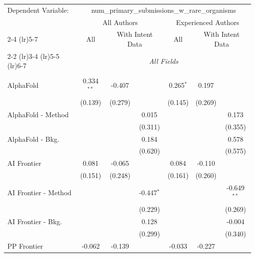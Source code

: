 \begingroup
\centering
\begin{tabular}{lcccccc}
   \tabularnewline \midrule \midrule
   Dependent Variable: & \multicolumn{6}{c}{num\_primary\_submissions\_w\_rare\_organisms}\\
 & \multicolumn{3}{c}{All Authors} & \multicolumn{3}{c}{Experienced Authors} \\
\cmidrule(lr){2-4} \cmidrule(lr){5-7}
 & \multicolumn{1}{c}{All} & \multicolumn{2}{c}{With Intent Data} & \multicolumn{1}{c}{All} & \multicolumn{2}{c}{With Intent Data} \\
\cmidrule(lr){2-2} \cmidrule(lr){3-4} \cmidrule(lr){5-5} \cmidrule(lr){6-7}
 & \multicolumn{6}{c}{\textit{All Fields}} \\ \\
   AlphaFold            & 0.334$^{**}$ & -0.407  &              & 0.265$^{*}$ & 0.197   &   \\   
                        & (0.139)      & (0.279) &              & (0.145)     & (0.269) &   \\   
   AlphaFold - Method   &              &         & 0.015        &             &         & 0.173\\   
                        &              &         & (0.311)      &             &         & (0.355)\\   
   AlphaFold - Bkg.     &              &         & 0.184        &             &         & 0.578\\   
                        &              &         & (0.620)      &             &         & (0.575)\\   
   AI Frontier          & 0.081        & -0.065  &              & 0.084       & -0.110  &   \\   
                        & (0.151)      & (0.248) &              & (0.161)     & (0.260) &   \\   
   AI Frontier - Method &              &         & -0.447$^{*}$ &             &         & -0.649$^{**}$\\   
                        &              &         & (0.229)      &             &         & (0.269)\\   
   AI Frontier - Bkg.   &              &         & 0.128        &             &         & -0.004\\   
                        &              &         & (0.299)      &             &         & (0.340)\\   
   PP Frontier          & -0.062       & -0.139  &              & -0.033      & -0.227  &   \\   

\end{tabular}

